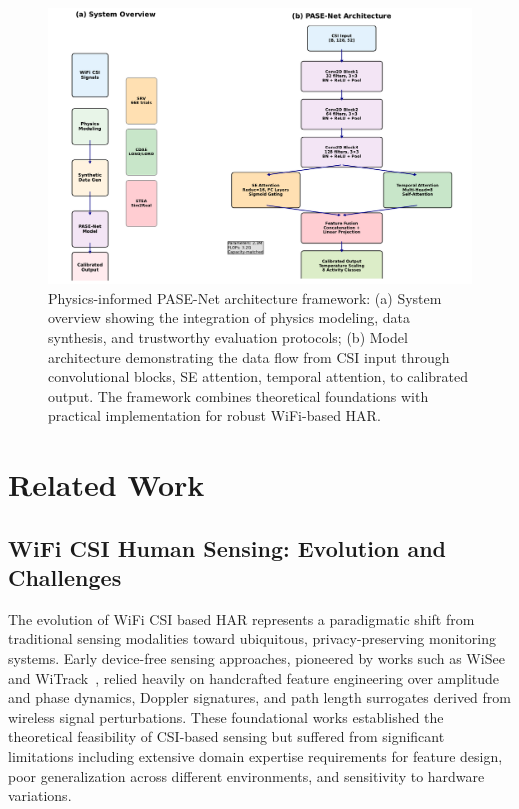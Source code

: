 \documentclass[journal]{IEEEtran}
\begin{document}
\begin{figure}[t]
\centering
\includegraphics[width=\linewidth]{plots/fig1_system_architecture.pdf}
\caption{Physics-informed PASE-Net architecture framework: (a) System overview showing the integration of physics modeling, data synthesis, and trustworthy evaluation protocols; (b) Model architecture demonstrating the data flow from CSI input through convolutional blocks, SE attention, temporal attention, to calibrated output. The framework combines theoretical foundations with practical implementation for robust WiFi-based HAR.}
\label{fig:system_architecture}
\end{figure}

\section{Related Work}

\subsection{WiFi CSI Human Sensing: Evolution and Challenges}

The evolution of WiFi CSI based HAR represents a paradigmatic shift from traditional sensing modalities toward ubiquitous, privacy-preserving monitoring systems. Early device-free sensing approaches, pioneered by works such as WiSee~\cite{pu2013whole} and WiTrack~\cite{adib2013see}, relied heavily on handcrafted feature engineering over amplitude and phase dynamics, Doppler signatures, and path length surrogates derived from wireless signal perturbations. These foundational works established the theoretical feasibility of CSI-based sensing but suffered from significant limitations including extensive domain expertise requirements for feature design, poor generalization across different environments, and sensitivity to hardware variations.
\end{document}
